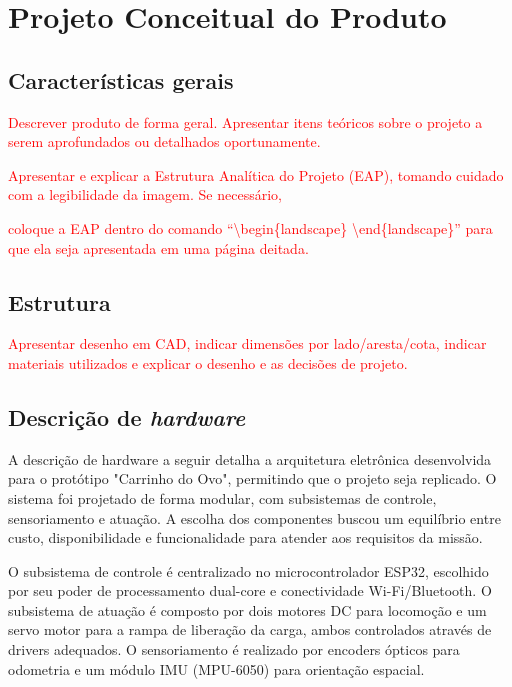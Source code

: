 \chapter{Projeto Conceitual do Produto}

\section{Características gerais}

\textcolor{red}{Descrever produto de forma geral. Apresentar itens teóricos sobre o projeto a serem aprofundados ou detalhados oportunamente.}

\textcolor{red}{Apresentar e explicar a Estrutura Analítica do Projeto (EAP), tomando cuidado com a legibilidade da imagem. Se necessário,}

\textcolor{red}{ coloque a EAP dentro do comando ``\textsf{\textbackslash begin\{landscape\} \textbackslash end\{landscape\}}'' para que ela seja apresentada em uma página deitada.}

\section{Estrutura}

\textcolor{red}{Apresentar desenho em CAD, indicar dimensões por lado/aresta/cota, indicar materiais utilizados e explicar o desenho e as decisões de projeto.}

\section{Descrição de \textit{hardware}}

\label{sec:hardware}

A descrição de hardware a seguir detalha a arquitetura eletrônica desenvolvida para o protótipo "Carrinho do Ovo", permitindo que o projeto seja replicado. O sistema foi projetado de forma modular, com subsistemas de controle, sensoriamento e atuação. A escolha dos componentes buscou um equilíbrio entre custo, disponibilidade e funcionalidade para atender aos requisitos da missão.

O subsistema de controle é centralizado no microcontrolador ESP32, escolhido por seu poder de processamento dual-core e conectividade Wi-Fi/Bluetooth. O subsistema de atuação é composto por dois motores DC para locomoção e um servo motor para a rampa de liberação da carga, ambos controlados através de drivers adequados. O sensoriamento é realizado por encoders ópticos para odometria e um módulo IMU (MPU-6050) para orientação espacial.

